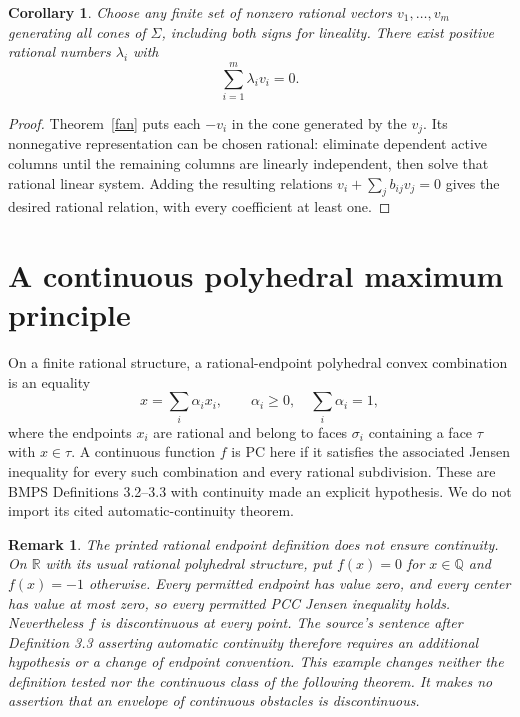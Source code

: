 \documentclass[11pt]{article}
\newtheorem{corollary}[theorem]{Corollary}
\newtheorem{remark}[theorem]{Remark}
\newcommand{\R}{\mathbb R}
\newcommand{\Q}{\mathbb Q}
\begin{document}
\begin{corollary}\label{relation}
Choose any finite set of nonzero rational vectors $v_1,\ldots,v_m$ generating all cones of $\Sigma$, including both signs for lineality. There exist positive rational numbers $\lambda_i$ with
\[\sum_{i=1}^m\lambda_i v_i=0.
\]
\end{corollary}
\begin{proof}
Theorem~\ref{fan} puts each $-v_i$ in the cone generated by the $v_j$. Its nonnegative representation can be chosen rational: eliminate dependent active columns until the remaining columns are linearly independent, then solve that rational linear system. Adding the resulting relations $v_i+\sum_j b_{ij}v_j=0$ gives the desired rational relation, with every coefficient at least one.
\end{proof}

\section{A continuous polyhedral maximum principle}
On a finite rational structure, a rational-endpoint polyhedral convex combination is an equality
\[x=\sum_i\alpha_i x_i,\qquad \alpha_i\geq0,\quad\sum_i\alpha_i=1,
\]
where the endpoints $x_i$ are rational and belong to faces $\sigma_i$ containing a face $\tau$ with $x\in\tau$. A continuous function $f$ is PC here if it satisfies the associated Jensen inequality for every such combination and every rational subdivision. These are BMPS Definitions 3.2--3.3 with continuity made an explicit hypothesis. We do not import its cited automatic-continuity theorem.

\begin{remark}\label{rational-pathology}
The printed rational endpoint definition does not ensure continuity. On $\R$ with its usual rational polyhedral structure, put $f(x)=0$ for $x\in\Q$ and $f(x)=-1$ otherwise. Every permitted endpoint has value zero, and every center has value at most zero, so every permitted PCC Jensen inequality holds. Nevertheless $f$ is discontinuous at every point. The source's sentence after Definition 3.3 asserting automatic continuity therefore requires an additional hypothesis or a change of endpoint convention. This example changes neither the definition tested nor the continuous class of the following theorem. It makes no assertion that an envelope of continuous obstacles is discontinuous.
\end{remark}
\end{document}
